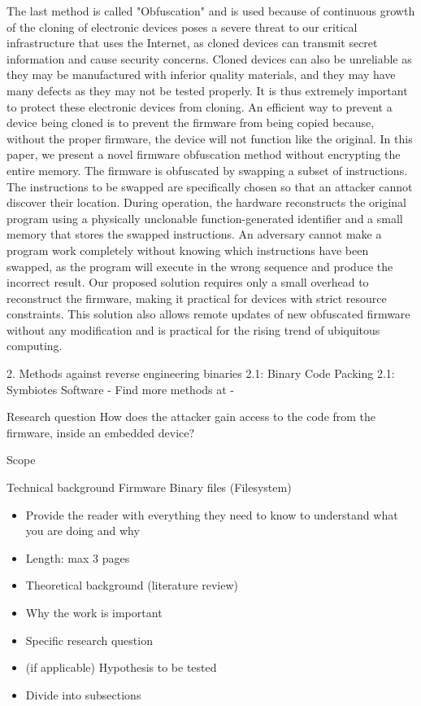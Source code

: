 \documentclass[]{report}
\begin{document}
\begin{center}
The last method is called "Obfuscation" and is used because of continuous growth of the cloning of electronic devices poses a severe threat to our critical infrastructure that uses the Internet, as cloned devices can transmit secret information and cause security concerns.
Cloned devices can also be unreliable as they may be manufactured with inferior quality materials, and they may have many defects as they may not be tested properly. It is thus extremely important to protect these electronic devices from cloning. An efficient way to prevent a device being cloned is to prevent the firmware from being copied because, without the proper firmware, the device will not function like the original. In this paper, we present a novel firmware obfuscation method without encrypting the entire memory. The firmware is obfuscated by swapping a subset of instructions. The instructions to be swapped are specifically chosen so that an attacker cannot discover their location. During operation, the hardware reconstructs the original program using a physically unclonable function-generated identifier and a small memory that stores the swapped instructions. An adversary cannot make a program work completely without knowing which instructions have been swapped, as the program will execute in the wrong sequence and produce the incorrect result. Our proposed solution requires only a small overhead to reconstruct the firmware, making it practical for devices with strict resource constraints. This solution also allows remote updates of new obfuscated firmware without any modification and is practical for the rising trend of ubiquitous computing.


\end{center}

2. Methods against reverse engineering binaries
2.1: Binary Code Packing
2.1: Symbiotes Software - 
Find more methods at - 

Research question
How does the attacker gain access to the code from the firmware, inside an embedded device?

Scope

Technical background
Firmware
Binary files (Filesystem)

\begin{itemize}
	\item Provide the reader with everything they need to know to understand what you are doing and why

	\item Length: max 3 pages
	\item Theoretical background (literature review)
	\item Why the work is important
	\item Specific research question
	\item (if applicable) Hypothesis to be tested
	\item Divide into subsections
\end{itemize}
\end{document}
